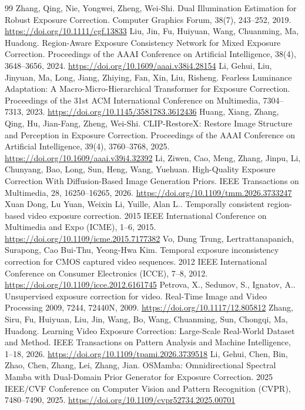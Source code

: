 \documentclass[twocolumn,10pt]{svjour3}
\begin{document}
\begin{thebibliography}{99}
 Zhang, Qing, Nie, Yongwei, Zheng, Wei‐Shi. Dual Illumination Estimation for Robust Exposure Correction. Computer Graphics Forum, 38(7), 243–252, 2019. \url{https://doi.org/10.1111/cgf.13833}
 Liu, Jin, Fu, Huiyuan, Wang, Chuanming, Ma, Huadong. Region-Aware Exposure Consistency Network for Mixed Exposure Correction. Proceedings of the AAAI Conference on Artificial Intelligence, 38(4), 3648–3656, 2024. \url{https://doi.org/10.1609/aaai.v38i4.28154}
 Li, Gehui, Liu, Jinyuan, Ma, Long, Jiang, Zhiying, Fan, Xin, Liu, Risheng. Fearless Luminance Adaptation: A Macro-Micro-Hierarchical Transformer for Exposure Correction. Proceedings of the 31st ACM International Conference on Multimedia, 7304–7313, 2023. \url{https://doi.org/10.1145/3581783.3612436}
 Huang, Xiang, Zhang, Qing, Hu, Jian-Fang, Zheng, Wei-Shi. CLIP-RestoreX: Restore Image Structure and Perception in Exposure Correction. Proceedings of the AAAI Conference on Artificial Intelligence, 39(4), 3760–3768, 2025. \url{https://doi.org/10.1609/aaai.v39i4.32392}
 Li, Ziwen, Cao, Meng, Zhang, Jinpu, Li, Chunyang, Bao, Long, Sun, Heng, Wang, Yuehuan. High-Quality Exposure Correction With Diffusion-Based Image Generation Priors. IEEE Transactions on Multimedia, 28, 16250–16265, 2026. \url{https://doi.org/10.1109/tmm.2026.3733247}
 Xuan Dong, Lu Yuan, Weixin Li, Yuille, Alan L.. Temporally consistent region-based video exposure correction. 2015 IEEE International Conference on Multimedia and Expo (ICME), 1–6, 2015. \url{https://doi.org/10.1109/icme.2015.7177382}
 Vo, Dung Trung, Lertrattanapanich, Surapong, Cao Bui-Thu, Yeong-Hwa Kim. Temporal exposure inconsistency correction for CMOS captured video sequences. 2012 IEEE International Conference on Consumer Electronics (ICCE), 7–8, 2012. \url{https://doi.org/10.1109/icce.2012.6161745}
 Petrova, X., Sedunov, S., Ignatov, A.. Unsupervised exposure correction for video. Real-Time Image and Video Processing 2009, 7244, 72440N, 2009. \url{https://doi.org/10.1117/12.805812}
 Zhang, Siru, Fu, Huiyuan, Liu, Jin, Wang, Bo, Wang, Chuanming, Sun, Chongqi, Ma, Huadong. Learning Video Exposure Correction: Large-Scale Real-World Dataset and Method. IEEE Transactions on Pattern Analysis and Machine Intelligence, 1–18, 2026. \url{https://doi.org/10.1109/tpami.2026.3739518}
 Li, Gehui, Chen, Bin, Zhao, Chen, Zhang, Lei, Zhang, Jian. OSMamba: Omnidirectional Spectral Mamba with Dual-Domain Prior Generator for Exposure Correction. 2025 IEEE/CVF Conference on Computer Vision and Pattern Recognition (CVPR), 7480–7490, 2025. \url{https://doi.org/10.1109/cvpr52734.2025.00701}

\end{thebibliography}
\end{document}
